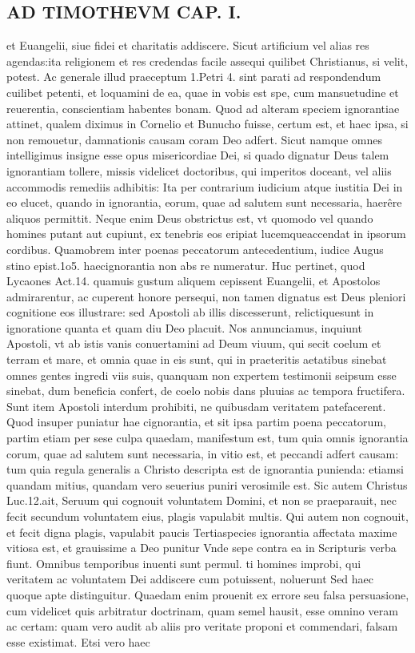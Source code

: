 \documentclass{article}
\begin{document}
\begin{pages}
\section*{AD TIMOTHEVM CAP. I. }
\marginpar{[ p.42 ]}\pstart et Euangelii, siue fidei et charitatis addiscere. Sicut artificium vel alias res agendas:ita religionem et res credendas facile assequi quilibet Christianus, si velit, potest. Ac generale illud praeceptum 1.Petri 4. sint parati ad respondendum cuilibet petenti, et loquamini de ea, quae in vobis est spe, cum mansuetudine et reuerentia, conscientiam habentes bonam. Quod ad alteram speciem ignorantiae attinet, qualem diximus in Cornelio et Bunucho fuisse, certum est, et haec ipsa, si non remouetur, damnationis causam coram Deo adfert. Sicut namque  omnes intelligimus insigne esse opus misericordiae Dei, si quado dignatur Deus talem ignorantiam tollere, missis videlicet doctoribus, qui imperitos doceant, vel aliis accommodis remediis adhibitis: Ita per contrarium iudicium atque  iustitia Dei in eo elucet, quando in ignorantia, eorum, quae ad salutem sunt necessaria, haerêre aliquos permittit. Neque  enim Deus obstrictus est, vt quomodo vel quando homines putant aut cupiunt, ex tenebris eos eripiat lucemqueaccendat in ipsorum cordibus. Quamobrem inter poenas peccatorum antecedentium, iudice Augus stino epist.1o5. haecignorantia non abs re numeratur. Huc pertinet, quod Lycaones Act.14. quamuis gustum aliquem cepissent Euangelii, et Apostolos admirarentur, ac cuperent honore persequi, non tamen dignatus est Deus pleniori cognitione eos illustrare: sed Apostoli ab illis discesserunt, relictiquesunt in ignoratione quanta et quam   diu Deo placuit. Nos annunciamus, inquiunt Apostoli, vt ab istis vanis conuertamini ad   Deum viuum, qui secit coelum et terram et mare, et omnia quae in eis sunt, qui in praeteritis aetatibus sinebat omnes gentes ingredi viis suis, quanquam non expertem   testimonii seipsum esse sinebat, dum beneficia confert, de coelo nobis dans pluuias ac   tempora fructifera. Sunt item Apostoli interdum prohibiti, ne quibusdam veritatem patefacerent.  \pend\pstart Quod insuper puniatur hae cignorantia, et sit ipsa partim poena peccatorum, partim etiam per sese culpa quaedam, manifestum est, tum quia omnis ignorantia corum, quae ad salutem sunt necessaria, in vitio est, et peccandi adfert causam: tum quia regula generalis a Christo descripta est de ignorantia punienda: etiamsi quandam mitius, quandam vero seuerius puniri verosimile est. Sic autem Christus Luc.12.ait, Seruum qui cognouit voluntatem Domini, et non se praeparauit, nec fecit secundum voluntatem eius, plagis vapulabit multis. Qui autem non cognouit, et fecit digna plagis, vapulabit paucis  \pend\pstart Tertiaspecies ignorantia affectata maxime vitiosa est, et grauissime a Deo punitur Vnde sepe contra ea in Scripturis verba fiunt. Omnibus temporibus inuenti sunt permul. ti homines improbi, qui veritatem ac voluntatem Dei addiscere cum potuissent, noluerunt Sed haec quoque  apte distinguitur. Quaedam enim prouenit ex errore seu falsa persuasione, cum videlicet quis arbitratur doctrinam, quam semel hausit, esse omnino veram ac certam: quam vero audit ab aliis pro veritate proponi et commendari, falsam esse existimat. Etsi vero haec 
\end{pages}
\end{document}
